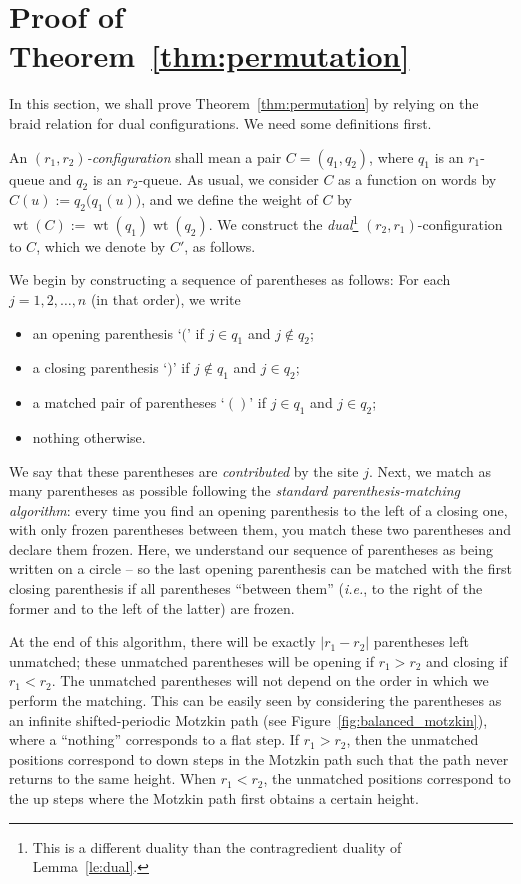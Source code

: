 \documentclass[reqno]{amsart}
\newcommand{\0}{\phantom{c}}
\DeclareMathOperator{\wt}{wt} %
\newcommand{\abs}[1]{\left| #1 \right|}
\newcommand{\defn}[1]{{\color{darkred}\emph{#1}}} %
\theoremstyle{plain}
\theoremstyle{definition}
\numberwithin{equation}{section}
\begin{document}
\section{Proof of Theorem~\ref{thm:permutation}}
\label{sec:thm_proof}

In this section, we shall prove Theorem~\ref{thm:permutation} by relying on the
braid relation for dual configurations. We need some definitions first.

An \defn{$(r_1,r_2)$-configuration} shall mean a pair $C = (q_1, q_2)$, where $q_1$ is an $r_1$-queue and $q_2$ is an $r_2$-queue.
As usual, we consider $C$ as a function on words by $C(u) := q_2\bigr(q_1(u)\bigr)$, and we define the weight of $C$ by $\wt(C) := \wt(q_1) \wt(q_2)$.
We construct the \defn{dual}\footnote{This is a different duality than the contragredient duality of Lemma~\ref{le:dual}.} $(r_2,r_1)$-configuration to $C$, which we denote by $C'$, as follows.

We begin by constructing a sequence of parentheses as follows: For each $j = 1, 2, \dotsc, n$ (in that order), we write
\begin{itemize}
\item an opening parenthesis `$($' if $j \in q_1$ and $j \notin q_2$;
\item a closing parenthesis `$)$' if $j \notin q_1$ and $j \in q_2$;
\item a matched pair of parentheses `$()$' if $j \in q_1$ and $j \in q_2$;
\item nothing otherwise.
\end{itemize}
We say that these parentheses are \defn{contributed} by the site $j$.
Next, we match as many parentheses as possible following the \defn{standard parenthesis-matching algorithm}:
every time you find an opening parenthesis to the left of a closing one, with only frozen parentheses between them, you match these two parentheses and declare them frozen.
Here, we understand our sequence of parentheses as being written on a circle -- so the last opening parenthesis can be matched with the first closing parenthesis if all parentheses ``between them'' (\textit{i.e.}, to the right of the former and to the left of the latter) are frozen.

At the end of this algorithm, there will be exactly $\abs{r_1 - r_2}$ parentheses left unmatched; these unmatched parentheses will be opening if $r_1 > r_2$ and closing if $r_1 < r_2$. The unmatched parentheses will not depend on the order in which we perform the matching.
This can be easily seen by considering the parentheses as an infinite shifted-periodic Motzkin path (see Figure~\ref{fig:balanced_motzkin}), where a ``nothing'' corresponds to a flat step.
If $r_1 > r_2$, then the unmatched positions correspond to down steps in the Motzkin path such that the path never returns to the same height.
When $r_1 < r_2$, the unmatched positions correspond to the up steps where the Motzkin path first obtains a certain height.
\end{document}
